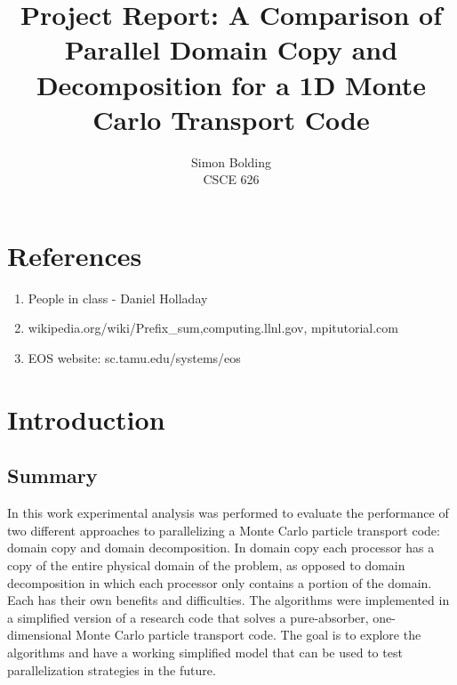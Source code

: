 \documentclass[12pt]{article}
\begin{document}
 
 
\title{Project Report: A Comparison of Parallel Domain Copy and Decomposition for a
1D Monte Carlo Transport Code}%
\author{Simon Bolding\\ %
CSCE 626} %
 
\maketitle

\clearpage

%

\section*{References}

\begin{enumerate}
	\item People in class - Daniel Holladay
	\item wikipedia.org/wiki/Prefix\_sum,computing.llnl.gov, mpitutorial.com
    \item EOS website: sc.tamu.edu/systems/eos
\end{enumerate}

\section{Introduction}

\subsection{Summary}

In this work experimental analysis was performed to evaluate the performance
of two different approaches to parallelizing a Monte Carlo particle transport code:
domain copy and domain decomposition.  In domain copy each processor has a copy of
the entire physical domain of the problem, as opposed to domain decomposition in
which each processor only contains a portion of the domain. Each has their own
benefits and difficulties.  The algorithms were
implemented in a simplified version of a research code that solves a 
pure-absorber, one-dimensional Monte Carlo particle transport code.  The goal is to
explore the algorithms and have a working simplified model that can be used to test
parallelization strategies in the future.  
\end{document}

